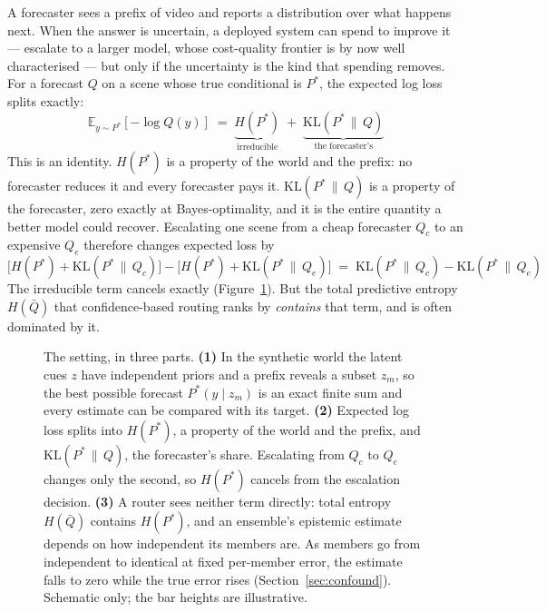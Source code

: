 \documentclass[10pt]{article}
\newcommand{\Pstar}{P^{*}}
\newcommand{\KL}[2]{\mathrm{KL}(#1\,\|\,#2)}
\begin{document}
A forecaster sees a prefix of video and reports a distribution over what happens next. When the
answer is uncertain, a deployed system can spend to improve it --- escalate to a larger model, whose
cost-quality frontier is by now well characterised \citep{bouchard2026escalation} --- but only if
the uncertainty is the kind that spending removes. For a forecast $Q$ on a scene whose true
conditional is $\Pstar$, the expected log loss splits exactly:
%
\begin{equation}
\mathbb{E}_{y\sim \Pstar}\!\left[-\log Q(y)\right]
  \;=\; \underbrace{H(\Pstar)}_{\text{irreducible}} \;+\; \underbrace{\KL{\Pstar}{Q}}_{\text{the forecaster's}}
\label{eq:split}
\end{equation}
%
This is an identity. $H(\Pstar)$ is a property of the world and the prefix: no forecaster reduces
it and every forecaster pays it. $\KL{\Pstar}{Q}$ is a property of the forecaster, zero exactly at
Bayes-optimality, and it is the entire quantity a better model could recover. Escalating one scene
from a cheap forecaster $Q_c$ to an expensive $Q_e$ therefore changes expected loss by
%
\begin{equation}
\big[H(\Pstar) + \KL{\Pstar}{Q_c}\big] - \big[H(\Pstar) + \KL{\Pstar}{Q_e}\big]
  \;=\; \KL{\Pstar}{Q_c} - \KL{\Pstar}{Q_e}
\label{eq:gain}
\end{equation}
%
The irreducible term cancels exactly (Figure~\ref{fig:overview}). But the total predictive entropy $H(\bar Q)$ that
confidence-based routing ranks by \emph{contains} that term, and is often dominated by it.

\begin{figure}[t]
\centering

\caption{The setting, in three parts. \textbf{(1)} In the synthetic world the latent cues $z$ have
independent priors and a prefix reveals a subset $z_m$, so the best possible forecast
$\Pstar(y\mid z_m)$ is an exact finite sum and every estimate can be compared with its target.
\textbf{(2)} Expected log loss splits into $H(\Pstar)$, a property of the world and the prefix, and
$\KL{\Pstar}{Q}$, the forecaster's share. Escalating from $Q_c$ to $Q_e$ changes only the second, so
$H(\Pstar)$ cancels from the escalation decision. \textbf{(3)} A router sees neither term directly:
total entropy $H(\bar Q)$ contains $H(\Pstar)$, and an ensemble's epistemic estimate depends on how
independent its members are. As members go from independent to identical at fixed per-member error,
the estimate falls to zero while the true error rises (Section~\ref{sec:confound}). Schematic only;
the bar heights are illustrative.}
\label{fig:overview}
\end{figure}
\end{document}
